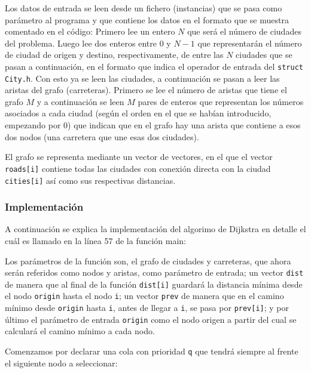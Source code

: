 \documentclass{article}
\begin{document}
Los datos de entrada se leen desde un fichero (instancias) que se pasa como parámetro al programa y que contiene los datos en el formato que se muestra comentado en el código:
Primero lee un entero $N$ que será el número de ciudades del problema. Luego lee dos enteros entre $0$ y $N-1$ que representarán el número de ciudad de origen y destino, respectivamente, de entre las $N$ ciudades que se pasan a continuación, en el formato que indica el operador de entrada del \texttt{struct City.h}. Con esto ya se leen las ciudades, a continuación se pasan a leer las aristas del grafo (carreteras). Primero se lee el número de aristas que tiene el grafo $M$ y a continuación se leen $M$ pares de enteros que representan los números asociados a cada ciudad (según el orden en el que se habían introducido, empezando por 0) que indican que en el grafo hay una arista que contiene a esos dos nodos (una carretera que une esas dos ciudades). 

El grafo se representa mediante un vector de vectores, en el que el vector \texttt{roads[i]} contiene todas las ciudades con conexión directa con la ciudad \texttt{cities[i]} así como sus respectivas distancias. 

\subsubsection{Implementación}
A continuación se explica la implementación del algorimo de Dijkstra en detalle el cuál es llamado en la línea 57 de la función main:



Los parámetros de la función son, el grafo de ciudades y carreteras, que ahora serán referidos como nodos y aristas, como parámetro de entrada; un vector \verb|dist| de manera que al final de la función \verb|dist[i]| guardará la distancia mínima desde el nodo \verb|origin| hasta el nodo \verb|i|; un vector \verb|prev| de manera que en el camino mínimo desde \verb|origin| hasta \verb|i|, antes de llegar a \verb|i|, se pasa por \verb|prev[i]|; y por último el parámetro de entrada \verb|origin| como el nodo origen a partir del cual se calculará el camino mínimo a cada nodo.

Comenzamos por declarar una cola con prioridad \verb|q| que tendrá siempre al frente el siguiente nodo a seleccionar:


\end{document}
